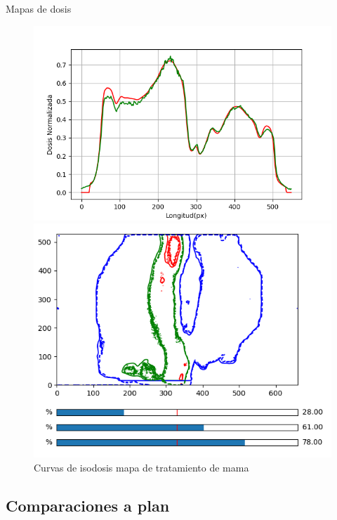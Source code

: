 \documentclass[12pt]{beamer}
\begin{document}
\begin{frame}{Mapas de dosis}
\begin{figure}[htp]
\begin{minipage}{0.4\textwidth}
		\includegraphics[width=\textwidth]{images/perfilDosisMama.png}
		\caption{Perfil mapa de tratamiento de mama}
	\end{minipage}\hfill
	\begin{minipage}{0.4\textwidth}
		\includegraphics[width=\textwidth]{images/curvasIsodosisMama.png}
		\caption{Curvas de isodosis mapa de tratamiento de mama}
	\end{minipage}
\end{figure}
\end{frame}

\subsection{Comparaciones a plan}
\end{document}
